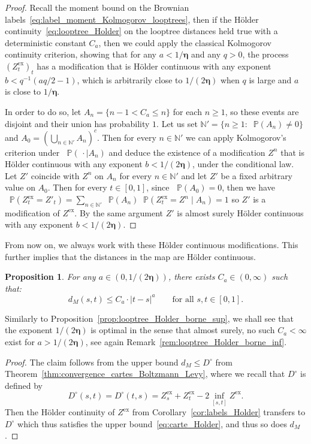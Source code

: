 \documentclass[british, a4paper,11pt]{article}
\numberwithin{equation}{section}
\newtheorem{prop}[thm]{Proposition}
\theoremstyle{definition}
\renewcommand{\P}{\mathop{}\!\mathbb{P}}
\newcommand{\N}{\mathbb{N}}
\newcommand{\Map}{M}
\newcommand{\bdeta}{\boldsymbol{\eta}}
\newcommand{\exc}{\mathrm{ex}}
\begin{document}
\begin{proof}
Recall the moment bound on the Brownian labels~\eqref{eq:label_moment_Kolmogorov_looptrees}, then if the H\"older continuity~\eqref{eq:looptree_Holder} on the looptree distances held true with a deterministic constant $C_a$, then we could apply the classical Kolmogorov continuity criterion, showing that for any $a < 1/\bdeta$ and any $q>0$, the process $(Z^{\exc}_t)_t$ has a modification that is H\"older continuous with any exponent $b < q^{-1} (aq/2-1)$, which is arbitrarily close to $1/(2\bdeta)$ when $q$ is large and $a$ is close to $1/\bdeta$.

In order to do so, let $A_n = \{n-1 < C_a \le n\}$ for each $n \ge 1$,  so these events are disjoint and their union has probability $1$.
Let us set $\N' = \{n \ge 1 \colon \P(A_n) \ne 0\}$ and $A_0 = (\bigcup_{n \in \N'} A_n)^c$.
Then for every $n \in \N'$ we can apply Kolmogorov's criterion under $\P(\,\cdot\mid A_n)$ and deduce the existence of a modification $Z^n$ that is H\"older continuous with any exponent $b<1/(2\bdeta)$, under the conditional law.
Let $Z'$ coincide with $Z^n$ on $A_n$ for every $n \in \N'$ and let $Z'$ be a fixed arbitrary value on $A_0$. 
Then for every $t \in [0,1]$, since $\P(A_0)=0$, then we have 
$\P(Z^{\exc}_t = Z'_t) = \sum_{n \in \N'} \P(A_n) \P(Z^{\exc}_t = Z^n \mid A_n) = 1$ so $Z'$ is a modification of $Z^{\exc}$. By the same argument $Z'$ is almost surely H\"older continuous with any exponent $b<1/(2\bdeta)$.
\end{proof}


From now on, we always work with these H\"older continuous modifications.
This further implies that the distances in the map are H\"older continuous.

\begin{prop}\label{prop:carte_Holder_borne_sup}
For any $a \in(0, 1/(2\bdeta))$, 
there exists $C_{a} \in (0, \infty)$ such that:
\begin{equation}\label{eq:carte_Holder}
d_\Map(s,t) \leq C_{a} \cdot |t-s|^{a}
\qquad\text{for all }s,t \in [0,1].
\end{equation}
\end{prop}

Similarly to Proposition~\ref{prop:looptree_Holder_borne_sup}, we shall see that the exponent $1/(2\bdeta)$ is optimal in the sense that almost surely, no such $C_a<\infty$ exist for $a > 1/(2\bdeta)$, see again Remark~\ref{rem:looptree_Holder_borne_inf}.


\begin{proof}
The claim follows from the upper bound $d_\Map \leq D^\circ$ from Theorem~\ref{thm:convergence_cartes_Boltzmann_Levy}, where we recall that $D^\circ$ is defined by
\[D^\circ(s,t) = D^\circ(t,s) = Z^{\exc}_s + Z^{\exc}_t - 2 \inf_{[s,t]} Z^{\exc}.\]
Then the H\"older continuity of $Z^{\exc}$ from Corollary~\ref{cor:labels_Holder} transfers to $D^\circ$
which thus satisfies the upper bound~\eqref{eq:carte_Holder}, and thus so does $d_M$.
\end{proof}
\end{document}
